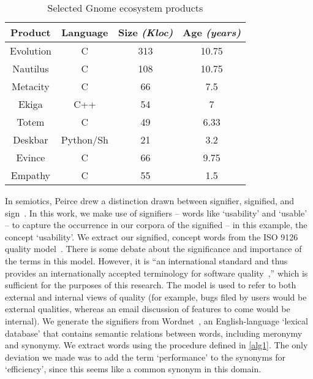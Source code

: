 \documentclass[conference, compsoc]{IEEEtran}
\begin{document}
\begin{table}
	\caption{Selected Gnome ecosystem products}
	\centering
	\label{tbl:projects}
\begin{tabular}{|c|c|c|c|}
\hline
\rowcolor[gray]{.9} 
\textbf{Product} & \textbf{Language} & \textbf{Size} \emph{(Kloc)} & \textbf{Age} \emph{(years)} \\
\hline
\hline 
Evolution & C & 313 & 10.75\\ \hline
Nautilus & C & 108 & 10.75  \\ \hline
Metacity & C & 66 & 7.5  \\ \hline
Ekiga & C++ & 54 & 7  \\ \hline
Totem & C & 49 & 6.33  \\ \hline
Deskbar & Python/Sh & 21 & 3.2  \\ \hline
Evince & C & 66 & 9.75\\ \hline
Empathy &C & 55 & 1.5\\ 
\hline
\end{tabular}
\end{table}

In semiotics, Peirce drew a distinction drawn between signifier, signified, and sign~\cite{atkin2006}. In this work, we make use of signifiers -- words like `usability' and `usable' -- to capture the occurrence in our corpora of the signified -- in this example, the concept `usability'. We extract our signified, concept words from the ISO 9126 quality model~\cite{iso9126}. There is some debate about the significance and importance of the terms in this model. However, it is ``an international standard and thus provides an internationally accepted terminology for software quality~\cite[p. 58]{Boegh2008},'' which is sufficient for the purposes of this research. The model is used to refer to both external and internal views of quality (for example, bugs filed by users would be external qualities, whereas an email discussion of features to come would be internal). We generate the signifiers from Wordnet~\cite{Fellbaum1998}, an English-language `lexical database' that contains semantic relations between words, including meronymy and synonymy. We extract words using the procedure defined in \ref{alg1}. The only deviation we made was to add the term `performance' to the synonyms for `efficiency', since this seems like a common synonym in this domain.%
\end{document}
